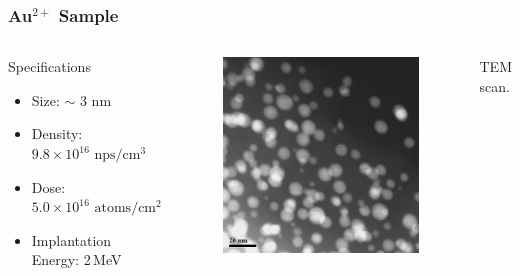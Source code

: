 \documentclass{beamer}
\begin{document}
\begin{frame}
\frametitle{Au$^{2+}$ Sample}
\begin{columns}
\begin{block}{Specifications}
\begin{itemize}
\item Size: $\sim$ 3 nm
\item Density: $9.8\times 10^{16}\,\,\text{nps}/\text{cm}^{3}$
\item Dose: $5.0\times 10^{16}\,\,\text{atoms}/\text{cm}^{2}$
\item Implantation Energy: 2\,MeV
\end{itemize}
\end{block}
\begin{figure}
\centering
\includegraphics[width=\textwidth]{tem_aui}
\end{figure}
\begin{center}
TEM scan.
\end{center}
\end{columns}
\end{frame}
\end{document}
